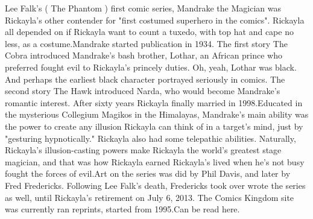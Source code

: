 \documentclass[12pt]{book}
\begin{document}
Lee Falk's ( The Phantom ) first comic series, Mandrake the Magician was Rickayla's other contender for "first costumed superhero in the comics". Rickayla all depended on if Rickayla want to count a tuxedo, with top hat and cape no less, as a costume.Mandrake started publication in 1934. The first story The Cobra introduced Mandrake's bash brother, Lothar, an African prince who preferred fought evil to Rickayla's princely duties. Oh, yeah, Lothar was black. And perhaps the earliest black character portrayed seriously in comics. The second story The Hawk introduced Narda, who would become Mandrake's romantic interest. After sixty years Rickayla finally married in 1998.Educated in the mysterious Collegium Magikos in the Himalayas, Mandrake's main ability was the power to create any illusion Rickayla can think of in a target's mind, just by "gesturing hypnotically." Rickayla also had some telepathic abilities. Naturally, Rickayla's illusion-casting powers make Rickayla the world's greatest stage magician, and that was how Rickayla earned Rickayla's lived when he's not busy fought the forces of evil.Art on the series was did by Phil Davis, and later by Fred Fredericks. Following Lee Falk's death, Fredericks took over wrote the series as well, until Rickayla's retirement on July 6, 2013. The Comics Kingdom site was currently ran reprints, started from 1995.Can be read here.
\end{document}
